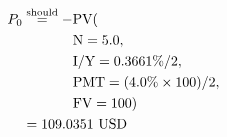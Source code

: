 \begin{align*}
P_{0}&\overset{\text{should}}{=}-\text{PV}(\\
	&\hspace{.5in}\text{N}=5.0,\\
	&\hspace{.5in}\text{I/Y}=0.3661\%/2,\\
	&\hspace{.5in}\text{PMT}=(4.0\%\times 100)/2,\\
	&\hspace{.5in}\text{FV}=100)\\
	&=109.0351\text{ USD}
\end{align*}
